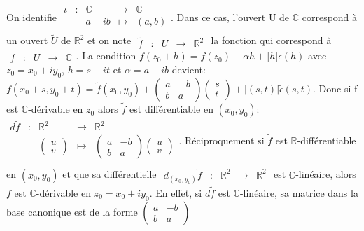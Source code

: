 \documentclass[]{report}
\begin{document}
\begin{re}On identifie $\begin{array}{ccccc}
\iota & : & \mathbb{C} & \to & \mathbb{C} \\
 & & a+ib & \mapsto & (a,b) \\
\end{array}$. Dans ce cas, l'ouvert U de $\mathbb{C}$ correspond à un ouvert $\widetilde{U}$ de $\mathbb{R}^2$ et on note $\begin{array}{ccccc}\widetilde{f} & : & \widetilde{U} & \to & \mathbb{R}^2\end{array}$ la fonction qui correspond à $\begin{array}{ccccc}f & : & U & \to & \mathbb{C}\end{array}$. La condition $f(z_0+h)=f(z_0)+\alpha h+ |h|\epsilon(h)$ avec $z_0=x_0+iy_0$, $h=s+it$ et $\alpha = a+ib$ devient:\\
$\widetilde{f}(x_0+s,y_0+t)=\widetilde{f}(x_0,y_0)+\begin{pmatrix}
a & -b \\
b & a 
\end{pmatrix}\begin{pmatrix}
s \\
t
\end{pmatrix}+|(s,t)|\widetilde{\epsilon}(s,t)$. Donc si f est $\mathbb{C}$-dérivable en $z_0$ alors $\widetilde{f}$ est différentiable en $(x_0,y_0)$:\\
$\begin{array}{ccccc}
d\widetilde{f} & : & \mathbb{R}^2 & \to & \mathbb{R}^2 \\
 & & \begin{pmatrix}
u \\
v
\end{pmatrix} & \mapsto & \begin{pmatrix}
a & -b \\
b & a 
\end{pmatrix}\begin{pmatrix}
u \\
v
\end{pmatrix} \\
\end{array}$. Réciproquement si $\widetilde{f}$ est $\mathbb{R}$-différentiable en $(x_0,y_0)$ et que sa différentielle $\begin{array}{ccccc}d_{(x_0,y_0)}\widetilde{f} & : & \mathbb{R}^2 & \to & \mathbb{R}^2\end{array}$ est $\mathbb{C}$-linéaire, alors $f$ est $\mathbb{C}$-dérivable en $z_0=x_0+iy_0$. En effet, si $d\widetilde{f}$ est $\mathbb{C}$-linéaire, sa matrice dans la base canonique est de la forme $\begin{pmatrix}
a & -b\\
b & a
\end{pmatrix}$
\end{re}
\end{document}

